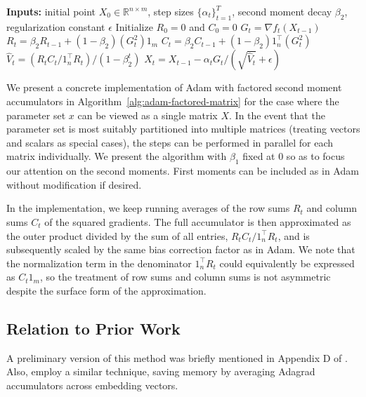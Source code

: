 \documentclass{article}
\begin{document}
\begin{algorithm}[t]
\begin{algorithmic}[1]
\STATE \textbf{Inputs:} initial point $X_0 \in \mathbb{R}^{n \times m}$, step sizes $\{\alpha_t\}_{t=1}^T$, second moment decay $\beta_2$, regularization constant $\epsilon$
\STATE Initialize $R_0 = 0$ and $C_0 = 0$
  \STATE $G_t = \nabla f_t(X_{t-1})$
  \STATE $R_t = \beta_2 R_{t-1} + (1 - \beta_2) (G_t^2) 1_m$
  \STATE $C_t = \beta_2 C_{t-1} + (1 - \beta_2) 1_n^\top (G_t^2)$
  \STATE $\hat{V}_t = (R_t C_t / 1_n^\top R_t) / (1 - \beta_2^t)$
  \STATE $X_t = X_{t-1} - \alpha_t G_t / (\sqrt{\hat{V}_t} + \epsilon)$
\ENDFOR
\end{algorithmic}
\caption{Adam for a matrix parameter $X$ with factored second moments and first moment decay parameter $\beta_1 = 0$.}
\label{alg:adam-factored-matrix}
\end{algorithm}

We present a concrete implementation of Adam with factored second moment accumulators in Algorithm~\ref{alg:adam-factored-matrix} for the case where the parameter set $x$ can be viewed as a single matrix $X$. In the event that the parameter set is most suitably partitioned into multiple matrices (treating vectors and scalars as special cases), the steps can be performed in parallel for each matrix individually. We present the algorithm with $\beta_1$ fixed at 0 so as to focus our attention on the second moments. First moments can be included as in Adam without modification if desired.

In the implementation, we keep running averages of the row sums $R_t$ and column sums $C_t$ of the squared gradients. The full accumulator is then approximated as the outer product divided by the sum of all entries, $R_t C_t / 1_n^\top R_t$, and is subsequently scaled by the same bias correction factor as in Adam. We note that the normalization term in the denominator $1_n^\top R_t$ could equivalently be expressed as $C_t 1_m$, so the treatment of row sums and column sums is not asymmetric despite the surface form of the approximation.

\subsection{Relation to Prior Work}

A preliminary version of this method was briefly mentioned in Appendix D of \citet{Shazeer17Outrageously}.  Also, \citet{Gupta14} employ a similar technique, saving memory by averaging Adagrad accumulators across embedding vectors.
\end{document}
